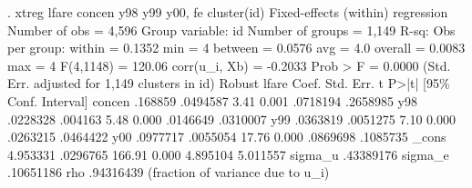 . xtreg lfare concen y98 y99 y00, fe cluster(id)
{\smallskip}
Fixed-effects (within) regression               Number of obs     =      4,596
Group variable: id                              Number of groups  =      1,149
{\smallskip}
R-sq:                                           Obs per group:
     within  = 0.1352                                         min =          4
     between = 0.0576                                         avg =        4.0
     overall = 0.0083                                         max =          4
{\smallskip}
                                                F(4,1148)         =     120.06
corr(u_i, Xb)  = -0.2033                        Prob > F          =     0.0000
{\smallskip}
                                 (Std. Err. adjusted for 1,149 clusters in id)
             {\VBAR}               Robust
       lfare {\VBAR}      Coef.   Std. Err.      t    P>|t|     [95\% Conf. Interval]
      concen {\VBAR}    .168859   .0494587     3.41   0.001     .0718194    .2658985
         y98 {\VBAR}   .0228328    .004163     5.48   0.000     .0146649    .0310007
         y99 {\VBAR}   .0363819   .0051275     7.10   0.000     .0263215    .0464422
         y00 {\VBAR}   .0977717   .0055054    17.76   0.000     .0869698    .1085735
       _cons {\VBAR}   4.953331   .0296765   166.91   0.000     4.895104    5.011557
     sigma_u {\VBAR}  .43389176
     sigma_e {\VBAR}  .10651186
         rho {\VBAR}  .94316439   (fraction of variance due to u_i)
{\smallskip}
